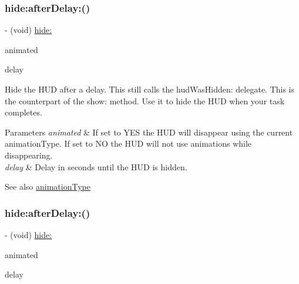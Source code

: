 \subsubsection{\texorpdfstring{hide\+:after\+Delay\+:()}{hide:afterDelay:()}\hspace{0.1cm}{\footnotesize\ttfamily [1/3]}}
{\footnotesize\ttfamily -\/ (void) \mbox{\hyperlink{interface_m_b_progress_h_u_d_a500fd79859e56cf98fd2eebfd37b4204}{hide\+:}} \begin{DoxyParamCaption}\item[{(B\+O\+OL)}]{animated }\item[{afterDelay:(N\+S\+Time\+Interval)}]{delay }\end{DoxyParamCaption}}

Hide the H\+UD after a delay. This still calls the hud\+Was\+Hidden\+: delegate. This is the counterpart of the show\+: method. Use it to hide the H\+UD when your task completes.


\begin{DoxyParams}{Parameters}
{\em animated} & If set to Y\+ES the H\+UD will disappear using the current animation\+Type. If set to NO the H\+UD will not use animations while disappearing. \\
\hline
{\em delay} & Delay in seconds until the H\+UD is hidden.\\
\hline
\end{DoxyParams}
\begin{DoxySeeAlso}{See also}
\mbox{\hyperlink{interface_m_b_progress_h_u_d_a71d04bb9e2839df9377ad10d03b2e468}{animation\+Type}} 
\end{DoxySeeAlso}
\mbox{\label{interface_m_b_progress_h_u_d_a4181ac00f5f1ef95bcfab6749e1642e6}} 
\subsubsection{\texorpdfstring{hide\+:after\+Delay\+:()}{hide:afterDelay:()}\hspace{0.1cm}{\footnotesize\ttfamily [2/3]}}
{\footnotesize\ttfamily -\/ (void) \mbox{\hyperlink{interface_m_b_progress_h_u_d_a500fd79859e56cf98fd2eebfd37b4204}{hide\+:}} \begin{DoxyParamCaption}\item[{(B\+O\+OL)}]{animated }\item[{afterDelay:(N\+S\+Time\+Interval)}]{delay }\end{DoxyParamCaption}}

